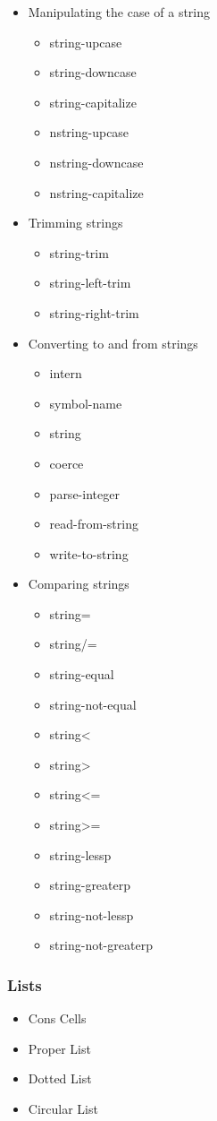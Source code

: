 \documentclass[11pt]{article}
\begin{document}
\begin{itemize}
\item Manipulating the case of a string
\begin{itemize}
\item string-upcase
\item string-downcase
\item string-capitalize
\item nstring-upcase
\item nstring-downcase
\item nstring-capitalize
\end{itemize}
\item Trimming strings
\begin{itemize}
\item string-trim
\item string-left-trim
\item string-right-trim
\end{itemize}
\item Converting to and from strings
\begin{itemize}
\item intern
\item symbol-name
\item string
\item coerce
\item parse-integer
\item read-from-string
\item write-to-string
\end{itemize}
\item Comparing strings
\begin{itemize}
\item string=
\item string/=
\item string-equal
\item string-not-equal
\item string<
\item string>
\item string<=
\item string>=
\item string-lessp
\item string-greaterp
\item string-not-lessp
\item string-not-greaterp
\end{itemize}
\end{itemize}
\subsubsection{Lists}
\label{sec-5-2-3}
\begin{itemize}
\item Cons Cells
\item Proper List
\item Dotted List
\item Circular List
\end{itemize}
\end{document}
